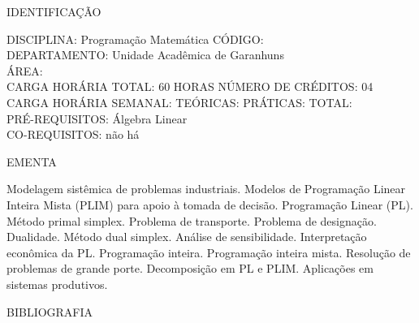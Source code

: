 \documentclass[
	12pt,				%
	openright,			%
  oneside,     %
	a4paper,			%
	chapter=TITLE,		%
	english,			%
	french,				%
	spanish,			%
	brazil				%
	]{abntex2}
\begin{document}
\begin{apendicesenv}
\newpage IDENTIFICAÇÃO

DISCIPLINA: Programação Matemática CÓDIGO:\\
DEPARTAMENTO: Unidade Acadêmica de Garanhuns\\
ÁREA: \\
CARGA HORÁRIA TOTAL: 60 HORAS NÚMERO DE CRÉDITOS: 04\\
CARGA HORÁRIA SEMANAL: TEÓRICAS: PRÁTICAS: TOTAL: \\
PRÉ-REQUISITOS: Álgebra Linear \\
CO-REQUISITOS: não há

EMENTA 

Modelagem sistêmica de problemas industriais. Modelos de Programação Linear Inteira Mista (PLIM) para apoio à tomada de decisão. Programação Linear (PL). Método primal simplex. Problema de transporte. Problema de designação. Dualidade. Método dual simplex. Análise de sensibilidade. Interpretação econômica da PL. Programação inteira. Programação inteira mista. Resolução de problemas de grande porte. Decomposição em PL e PLIM. Aplicações em sistemas produtivos.

BIBLIOGRAFIA 


\end{apendicesenv}
\end{document}

